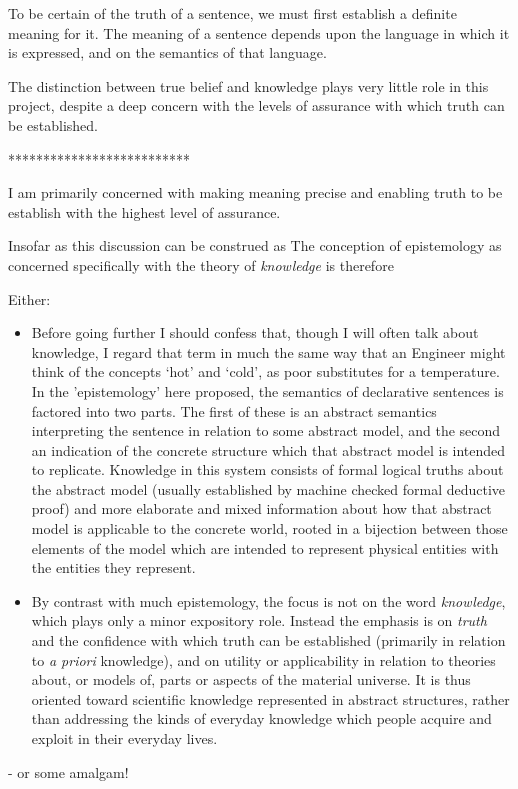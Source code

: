 \documentclass[10pt,titlepage]{book}
\begin{document}
To be certain of the truth of a sentence, we must first establish a definite meaning for it.
The meaning of a sentence depends upon the language in which it is expressed, and on the semantics of that language.

The distinction between true belief and knowledge plays very little role in this project, despite a deep concern with the levels of assurance with which truth can be established.

**************************


I am primarily concerned with making meaning precise and enabling truth to be establish with the highest level of assurance.

Insofar as this discussion can be construed as 
The conception of epistemology as concerned specifically with the theory of \emph{knowledge} is therefore 

Either:
\begin{itemize}
  \item
Before going further I should confess that, though I will often talk about knowledge, I regard that term in much the same way that an Engineer might think of the concepts `hot' and `cold', as poor substitutes for a temperature.
In the 'epistemology' here proposed, the semantics of declarative sentences is factored into two parts.
The first of these is an abstract semantics interpreting the sentence in relation to some abstract model, and the second an indication of the concrete structure which that abstract model is intended to replicate.
Knowledge in this system consists of formal logical truths about the abstract model (usually established by machine checked formal deductive proof) and more elaborate and mixed information about how that abstract model is applicable to the concrete world, rooted in a bijection between those elements of the model which are intended to represent physical entities with the entities they represent.
\item
By contrast with much epistemology, the focus is not on the word \emph{knowledge}, which plays only a minor expository role.
Instead the emphasis is on \emph{truth} and the confidence with which truth can be established (primarily in relation to \emph{a priori} knowledge), and on utility or applicability in relation to theories about, or models of, parts or aspects of the material universe.
It is thus oriented toward scientific knowledge represented in abstract structures, rather than addressing the kinds of everyday knowledge which people acquire and exploit in their everyday lives.
\end{itemize}
- or some amalgam!
\end{document}

